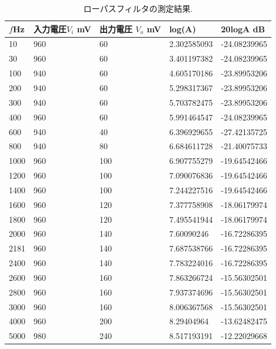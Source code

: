 \documentclass[twocolumn, 10pt,a4j]{jsarticle}
\begin{document}
          \begin{table}[t]
            \centering
            \footnotesize
            \caption{ローパスフィルタの測定結果.}
            \label{opeanpu_risouteki_tokusei}
          \begin{tabular}{lllll} \hline

                  $f$Hz& 入力電圧$V_{i}$ mV& 出力電圧 $V_{o}$ mV& log(A)& 20logA dB \\ \hline
                  10& 960& 60& 2.302585093& -24.08239965 \\
                  30& 960& 60& 3.401197382& -24.08239965 \\
                  100& 940& 60& 4.605170186& -23.89953206 \\
                  200& 940& 60& 5.298317367& -23.89953206 \\
                  300& 940& 60& 5.703782475& -23.89953206 \\
                  400& 960& 60& 5.991464547& -24.08239965 \\
                  600& 940& 40& 6.396929655& -27.42135725 \\
                  800& 940& 80& 6.684611728& -21.40075733 \\
                  1000& 960& 100& 6.907755279& -19.64542466 \\
                  1200& 960& 100& 7.090076836& -19.64542466 \\
                  1400& 960& 100& 7.244227516& -19.64542466 \\
                  1600& 960& 120& 7.377758908& -18.06179974 \\
                  1800& 960& 120& 7.495541944& -18.06179974 \\
                  2000& 960& 140& 7.60090246& -16.72286395 \\
                  2181& 960& 140& 7.687538766& -16.72286395 \\
                  2400& 960& 140& 7.783224016& -16.72286395 \\
                  2600& 960& 160& 7.863266724& -15.56302501 \\
                  2800& 960& 160& 7.937374696& -15.56302501 \\
                  3000& 960& 160& 8.006367568& -15.56302501 \\
                  4000& 960& 200& 8.29404964& -13.62482475 \\
                  5000& 980& 240& 8.517193191& -12.22029668 \\

\end{tabular}
\end{table}
\end{document}
